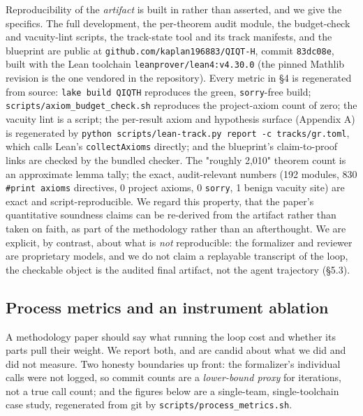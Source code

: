 \documentclass[11pt]{article}
\begin{document}
Reproducibility of the \emph{artifact} is built in rather than asserted, and we give the specifics. The
full development, the per-theorem audit module, the budget-check and vacuity-lint scripts, the
track-state tool and its track manifests, and the blueprint are public at
\texttt{github.com/kaplan196883/QIQT-H}, commit \texttt{83dc08e}, built with the Lean toolchain
\texttt{leanprover/lean4:v4.30.0} (the pinned Mathlib revision is the one vendored in the repository).
Every metric in §4 is regenerated from source: \texttt{lake build QIQTH} reproduces the green, \texttt{sorry}-free
build; \texttt{scripts/axiom\_budget\_check.sh} reproduces the project-axiom count of zero; the vacuity lint
is a script; the per-result axiom and hypothesis surface (Appendix A) is regenerated by
\texttt{python scripts/lean-track.py report -c tracks/gr.toml}, which calls Lean's \texttt{collectAxioms} directly;
and the blueprint's claim-to-proof links are checked by the bundled checker. The "roughly 2,010"
theorem count is an approximate lemma tally; the exact, audit-relevant numbers (192 modules, 830
\texttt{\#print axioms} directives, 0 project axioms, 0 \texttt{sorry}, 1 benign vacuity site) are exact and
script-reproducible. We regard this property, that the paper's quantitative soundness claims can be
re-derived from the artifact rather than taken on faith, as part of the methodology rather than an
afterthought. We are explicit, by contrast, about what is \emph{not} reproducible: the formalizer and
reviewer are proprietary models, and we do not claim a replayable transcript of the loop, the
checkable object is the audited final artifact, not the agent trajectory (§5.3).

\subsection{Process metrics and an instrument ablation}

A methodology paper should say what running the loop cost and whether its parts pull their weight. We
report both, and are candid about what we did and did not measure. Two honesty boundaries up front:
the formalizer's individual calls were not logged, so commit counts are a \emph{lower-bound proxy} for
iterations, not a true call count; and the figures below are a single-team, single-toolchain case
study, regenerated from git by \texttt{scripts/process\_metrics.sh}.
\end{document}
